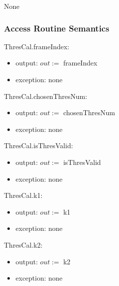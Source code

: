 \documentclass[12pt, titlepage]{article}
\begin{document}
None

\subsubsection{Access Routine Semantics}

\noindent ThresCal.frameIndex:
\begin{itemize}
\item output: $out :=$ frameIndex
\item exception: none 
\end{itemize}

\noindent ThresCal.chosenThresNum:
\begin{itemize}
\item output: $out :=$ chosenThresNum
\item exception: none 
\end{itemize}

\noindent ThresCal.isThresValid:
\begin{itemize}
\item output: $out :=$ isThresValid
\item exception: none 
\end{itemize}

\noindent ThresCal.k1:
\begin{itemize}
\item output: $out :=$ k1
\item exception: none 
\end{itemize}

\noindent ThresCal.k2:
\begin{itemize}
\item output: $out :=$ k2
\item exception: none 
\end{itemize}
\end{document}
